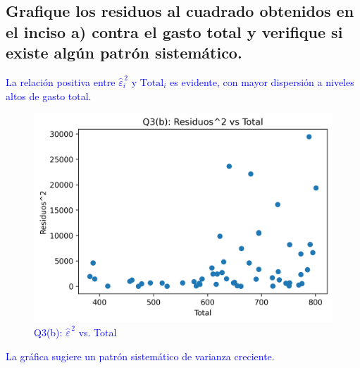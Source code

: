 \documentclass[10pt]{article}
\begin{document}
\subsection{Grafique los residuos al cuadrado obtenidos en el inciso a) contra el gasto total y verifique si existe algún patrón sistemático.}
    \textcolor{blue}{
        La relación positiva entre $\widehat{\varepsilon}_i^{\,2}$ y $\text{Total}_i$ es evidente, con mayor dispersión a niveles altos de gasto total.
        \begin{figure}[H]
            \centering
            \includegraphics[width=0.7\linewidth]{../plots/python/ex3/q3_b_resid2_vs_total.png}
            \caption{Q3(b): $\widehat{\varepsilon}^{\,2}$ vs. Total}
            \label{fig:q3_b_resid2}
        \end{figure}
        La gráfica sugiere un patrón sistemático de varianza creciente.
    }
\end{document}
